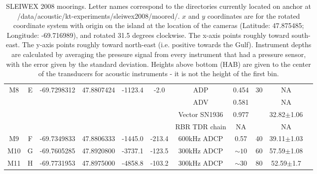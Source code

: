 \documentclass[letterpaper,10pt,landscape]{article}
\begin{document}
\begin{table}
\begin{tabular}{|c|c|c|c|c|c|c|c|c|c|c|}
                                                                                                                                                                                                                          
      \multirow{4}{*}{M8} & \multirow{4}{*}{E} & \multirow{4}{*}{-69.7298312} & \multirow{4}{*}{47.8807424} & \multirow{4}{*}{-1123.4}  & \multirow{4}{*}{-2.0}   & ADP                & 0.454      & \multirow{4}{*}{30} & NA                & \\ 
                          &                    &                              &                             &                           &                         & ADV                & 0.581      &                     & NA                & \\ 
                          &                    &                              &                             &                           &                         & Vector SN1936      & 0.977      &                     & 32.82$\pm$1.06    & \\ 
                          &                    &                              &                             &                           &                         & RBR TDR chain      & NA         &                     & NA                & \\ \hline
       M9                 & F                  & -69.7349833                  & 47.8806333                  & -1445.0                   & -213.4                  & 600kHz ADCP        & 0.57       & 40                  & 39.11$\pm$1.03    & \\ \hline
       M10                & G                  & -69.7605285                  & 47.8920800                  & -3737.1                   & -123.5                  & 300kHz ADCP        & $\sim10$   & 60                  & 57.59$\pm$1.08    & \\ \hline
       M11                & H                  & -69.7731953                  & 47.8975000                  & -4858.8                   & -103.2                  & 300kHz ADCP        & $\sim30$   & 80                  & 52.59$\pm$1.7     & \\ \hline
    \end{tabular}
    \caption{SLEIWEX 2008 moorings. Letter names correspond to the directories currently located on anchor at /data/acoustic/kt-experiments/sleiwex2008/moored/. $x$ and $y$ coordinates are for the rotated coordinate system with origin on the island at the location of the cameras (Latitude: 47.875485; Longitude: -69.716989), and rotated 31.5 degrees clockwise. The x-axis points roughly toward south-east. The y-axis points roughly toward north-east (i.e. positive towards the Gulf). Instrument depths are calculated by averaging the pressure signal from every instrument that had a pressure sensor, with the error given by the standard deviation. Heights above bottom (HAB) are given to the center of the transducers for acoustic instruments - it is not the height of the first bin.}
  \end{table}
\end{document}
